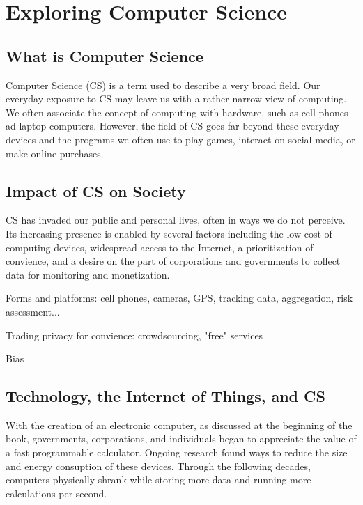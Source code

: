 
\chapter{Exploring Computer Science}

\section{What is Computer Science}

Computer Science (CS) is a term used to describe a very broad field. Our everyday exposure to CS may leave us with a rather narrow view of computing. We often associate the concept of computing with hardware, such as cell phones ad laptop computers. However, the field of CS goes far beyond these everyday devices and the programs we often use to play games, interact on social media, or make online purchases.



\section{Impact of CS on Society}

CS has invaded our public and personal lives, often in ways we do not perceive. Its increasing presence is enabled by several factors including the low cost of computing devices, widespread access to the Internet, a prioritization of convience, and a desire on the part of corporations and governments to collect data for monitoring and monetization.

Forms and platforms: cell phones, cameras, GPS, tracking data, aggregation, risk assessment... 

Trading privacy for convience: crowdsourcing, "free" services

Bias


\section{Technology, the Internet of Things, and CS}

With the creation of an electronic computer, as discussed at the beginning of the book, governments, corporations, and individuals began to appreciate the value of a fast programmable calculator. Ongoing research found ways to reduce the size and energy consuption of these devices. Through the following decades, computers physically shrank while storing more data and running more calculations per second. 

